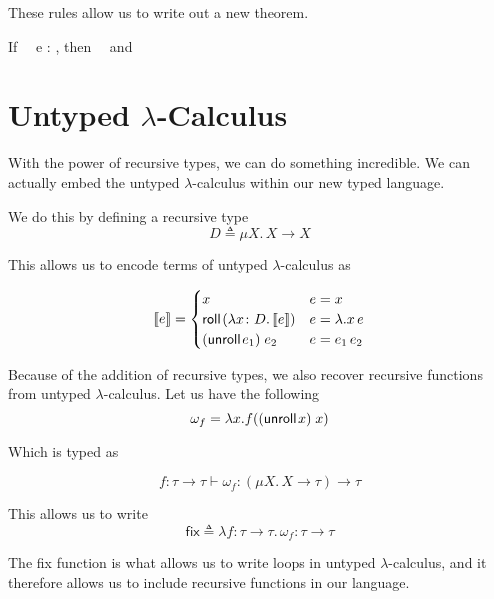 \documentclass{lecturenotes}
\newcommand{\tabs}[3]{\ensuremath{\lambda #1 \colon #2.\,#3}}
\newcommand{\app}[2]{\ensuremath{#1\;#2}}
\newcommand{\rectype}[2]{\ensuremath{\mu #1.\,#2}}
\newcommand{\roll}[1]{\textsf{roll}\mkern2mu#1}
\newcommand{\unroll}[1]{\textsf{unroll}\mkern2mu#1}
\begin{document}
These rules allow us to write out a new theorem.
\begin{thm}
  If \Gamma\, \vdash\, e : \tau, then \cdot\, \vdash\, \Gamma and \cdot\, \vdash\, \tau
\end{thm}

\section{Untyped $\lambda$-Calculus}
With the power of recursive types, we can do something incredible.
We can actually embed the untyped $\lambda$-calculus within our new typed language.

We do this by defining a recursive type
\[
  D \triangleq \rectype{X}{X \to X}
\]

This allows us to encode terms of untyped $\lambda$-calculus as

\[
  \llbracket e \rrbracket = \begin{cases}
    x & e = x\\
    \roll{(\tabs{x}{D}{\llbracket e \rrbracket})} & e = \lambda. x\, e\\
    \app{(\unroll{e_1})}{e_2} & e = e_1\, e_2
  \end{cases}
\]

Because of the addition of recursive types, we also recover recursive functions from untyped $\lambda$-calculus.
Let us have the following
\[
  \omega_f = \lambda x. f(\app{(\unroll{x})} {x})
\]

Which is typed as

\[
  f : \tau \to \tau \vdash \omega_f : (\rectype{X}{X \to \tau}) \to \tau
\]

This allows us to write
\[
  \textsf{fix} \triangleq \tabs{f}{\tau \to \tau}{\omega_f}: \tau \to \tau
\]

The \textsf{fix} function is what allows us to write loops in untyped $\lambda$-calculus, and it therefore allows us to include recursive functions in our language.
\end{document}
